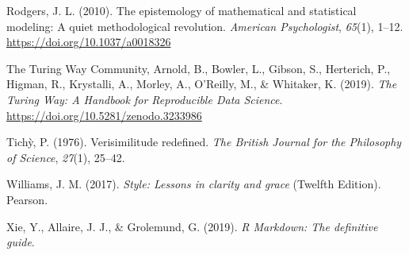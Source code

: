 \documentclass[12pt,a4paper,]{article}
\begin{document}
\leavevmode\hypertarget{ref-rodgersEpistemologyMathematicalStatistical2010}{}%
Rodgers, J. L. (2010). The epistemology of mathematical and statistical modeling: A quiet methodological revolution. \emph{American Psychologist}, \emph{65}(1), 1--12. \url{https://doi.org/10.1037/a0018326}

\leavevmode\hypertarget{ref-theturingwaycommunityTuringWayHandbook2019}{}%
The Turing Way Community, Arnold, B., Bowler, L., Gibson, S., Herterich, P., Higman, R., Krystalli, A., Morley, A., O'Reilly, M., \& Whitaker, K. (2019). \emph{The Turing Way: A Handbook for Reproducible Data Science}. \url{https://doi.org/10.5281/zenodo.3233986}

\leavevmode\hypertarget{ref-tichyVerisimilitudeRedefined1976}{}%
Tichỳ, P. (1976). Verisimilitude redefined. \emph{The British Journal for the Philosophy of Science}, \emph{27}(1), 25--42.

\leavevmode\hypertarget{ref-williamsStyleLessonsClarity2017}{}%
Williams, J. M. (2017). \emph{Style: Lessons in clarity and grace} (Twelfth Edition). Pearson.

\leavevmode\hypertarget{ref-xieMarkdownDefinitiveGuide2019}{}%
Xie, Y., Allaire, J. J., \& Grolemund, G. (2019). \emph{R Markdown: The definitive guide}.
\end{document}
